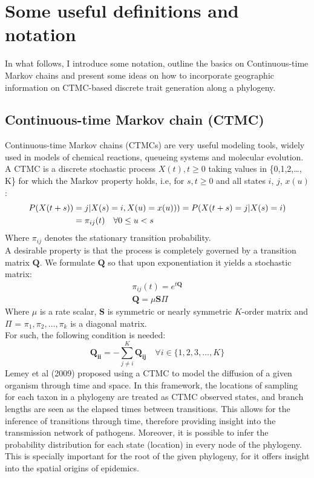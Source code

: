 \documentclass[a4paper,10pt]{article}
\begin{document}
\section{Some useful definitions and notation}
\indent In what follows, I introduce some notation, outline the basics on Continuous-time Markov chains and present some ideas on how to incorporate geographic information on CTMC-based discrete trait generation along a phylogeny.\\
\subsection{Continuous-time Markov chain (CTMC)}
\indent Continuous-time Markov chains (CTMCs) are very useful modeling tools, widely used in models of chemical reactions, queueing systems and molecular evolution. A CTMC is a discrete stochastic process $X(t), t\geq0$ taking values in \{0,1,2,\ldots, K\} for which the Markov property holds, i.e, for $s,t\geq 0$ and all states $i$, $j$, $x(u)$:
\begin{equation}
\label{ctmc}
\begin{split}
P(X(t+s)) &= j|X(s) =i, X(u)=x(u))) = P(X(t+s)=j|X(s)=i)\\ 
& = \pi_{ij}(t) \quad \forall \space 0\leq u < s
\end{split}
\end{equation}
Where $\pi_{ij}$ denotes the stationary transition probability.\\
\indent A desirable property is that the process is completely governed by a transition matrix $\mathbf{Q}$. We formulate $\mathbf{Q}$ so that upon exponentiation it yields a stochastic matrix:
\begin{align}
\label{qform}
 \pi_{ij}(t) = e^{t\mathbf{Q}} \\
 \mathbf{Q} = \mu\mathbf{S}\Pi
\end{align}
Where $\mu$ is a rate scalar, $\mathbf{S}$ is symmetric or nearly symmetric $K$-order matrix and $\Pi$ = $\pi_1, \pi_2,\ldots, \pi_k$ is a diagonal matrix.\\
\indent For such, the following condition is needed:
\begin{equation}
\mathbf{Q_{ii}} = -\sum_{j \neq i}^K{\mathbf{Q_{ij}}}  \quad \forall{ i \in \{1,2,3,\ldots,K\}}
\label{sumconst}
\end{equation}
\indent Lemey et al (2009) \cite{Lemey2009} proposed using a CTMC to model the diffusion of a given organism through time and space. In this framework, the locations of sampling for each taxon in a phylogeny are treated as CTMC observed states, and branch lengths are seen as the elapsed times between transitions. This allows for the inference of transitions through time, therefore providing insight into the transmission network of pathogens. Moreover, it is possible to infer the probability distribution for each state (location) in every node of the phylogeny. This is specially important for the root of the given phylogeny, for it offers insight into the spatial origins of epidemics.\\
\end{document}
